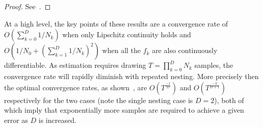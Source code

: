 \vspace{-12pt}
\begin{proof}
	See~\citep{rainforth2017pitfalls}.
\end{proof}
\noindent At a high level, the key points of these results are a convergence rate of $O(\sum_{k=0}^{D} 1/N_k)$
when only Lipschitz continuity holds and $O(1/N_0 +(\sum_{k=1}^{D} 1/N_k)^2)$ when
all the $f_k$ are also continuously differentiable.  
As estimation requires drawing $T = \prod_{k=0}^{D} N_k$ samples, 
the convergence rate will rapidly diminish with repeated nesting.  More precisely then the optimal convergence rates,
as shown~\cite{rainforth2017pitfalls}, are
$O(T^{\frac{-1}{D}})$ and $O(T^{\frac{-2}{D+1}})$ respectively for the two cases (note the single nesting case 
is $D=2$), both of which
imply that exponentially more samples are required to achieve a given error as $D$ is increased.
